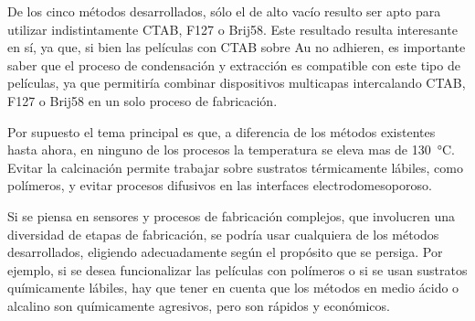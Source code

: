 	De los cinco métodos desarrollados, sólo el de alto vacío resulto ser apto para utilizar indistintamente CTAB, F127 o Brij58. Este resultado resulta interesante en sí, ya que, si bien las películas con CTAB sobre Au no adhieren, es importante saber que el proceso de condensación y extracción es compatible con este tipo de películas, ya que permitiría combinar dispositivos multicapas intercalando CTAB, F127 o Brij58 en un solo proceso de fabricación.


	
	Por supuesto el tema principal es que, a diferencia de los métodos existentes hasta ahora, en ninguno de los procesos la temperatura se eleva mas de \SI{130}{\celsius}. Evitar la calcinación permite trabajar sobre sustratos térmicamente lábiles, como polímeros, y evitar procesos difusivos en las interfaces electrodo\textbar mesoporoso. 

	Si se piensa en sensores y procesos de fabricación complejos, que involucren una diversidad de etapas de fabricación, se podría usar cualquiera de los métodos desarrollados, eligiendo adecuadamente según el propósito que se persiga. Por ejemplo, si se desea funcionalizar las películas con polímeros o si se usan sustratos químicamente lábiles, hay que tener en cuenta que los métodos en medio ácido o alcalino son químicamente agresivos, pero son rápidos y económicos. 


